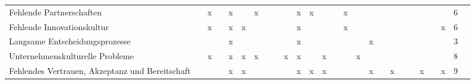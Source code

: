 \begin{sidewaystable}[ht]
\begin{tabular}{|p{6cm}|c|c|c|c|c|c|c|c|c|c|c|c|c|c|c|c|c|c|c|c|c|c|c|c|c|}
		Fehlende Partnerschaften                        &                   & x                  &                    & x                    &                    & x                 &                   &                      &                    & x                    & x                &                  &                     & x                &                 &                      &                    &                 &                  &                  &                        &                      &                        & 6  \\
		Fehlende Innovationskultur                      &                   & x                  &                    & x                    & x                  &                   &                   &                      &                    & x                    &                  &                  &                     & x                &                 &                      &                    &                 &                  &                  &                        &                      & x                      & 6  \\
		Langsame Entscheidungsprozesse                  &                   &                    &                    & x                    &                    &                   &                   &                      &                    & x                    &                  &                  &                     &                  &                 & x                    &                    &                 &                  &                  &                        &                      &                        & 3  \\
		Unternehmenskulturelle Probleme                 &                   & x                  &                    & x                    & x                  & x                 &                   &                      & x                  & x                    &                  & x                &                     &                  & x               &                      &                    &                 &                  &                  &                        &                      &                        & 8  \\
		Fehlendes Vertrauen, Akzeptanz und Bereitschaft &                   &                    &                    & x                    & x                  &                   &                   &                      &                    & x                    & x                & x                &                     &                  &                 & x                    &                    & x               &                  &                  & x                      &                      & x                      & 9  \\

\end{tabular}
\end{sidewaystable}
